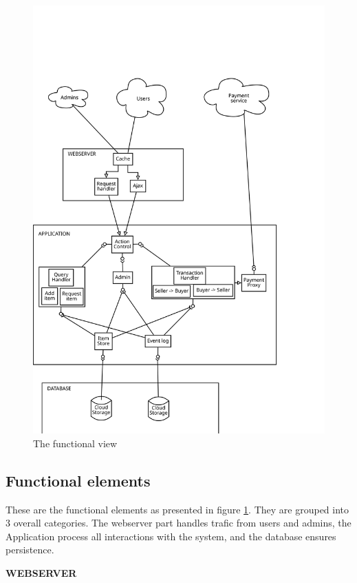 \documentclass[a4paper,11pt]{report}
\begin{document}
\begin{figure}
\label{fig:funcView}
\centering
\caption{The functional view}
\includegraphics[width=\textwidth]{figures/functional-view}
\end{figure}

\subsection{Functional elements}
\label{sec:functional-elements}
These are the functional elements as presented in figure \ref{fig:funcView}.
They are grouped into 3 overall categories. The webserver part handles trafic
from users and admins, the Application process all interactions with the system,
and the database ensures persistence.

\textbf{WEBSERVER}
\end{document}
